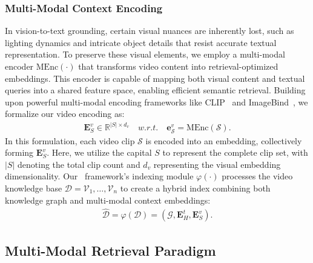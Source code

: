 \subsubsection{Multi-Modal Context Encoding}
\label{sec:visual indexing}

In vision-to-text grounding, certain visual nuances are inherently lost, such as lighting dynamics and intricate object details that resist accurate textual representation. To preserve these visual elements, we employ a multi-modal encoder $\text{MEnc}(\cdot)$ that transforms video content into retrieval-optimized embeddings. This encoder is capable of mapping both visual content and textual queries into a shared feature space, enabling efficient semantic retrieval. Building upon powerful multi-modal encoding frameworks like CLIP~\citep{CLIP} and ImageBind~\citep{Imgebind}, we formalize our video encoding as:
\begin{align}
    \mathbf{E}_{S}^{v} \in \mathbb{R}^{|S| \times d_{v}} \quad \textit{w.r.t.} \quad \textbf{e}_{\mathcal{S}}^{v} = \text{MEnc}(\mathcal{S}).
\end{align}
In this formulation, each video clip $\mathcal{S}$ is encoded into an embedding, collectively forming $\mathbf{E}_{S}^{v}$. Here, we utilize the capital $S$ to represent the complete clip set, with $|S|$ denoting the total clip count and $d_{v}$ representing the visual embedding dimensionality. Our \model\ framework's indexing module $\varphi(\cdot)$ processes the video knowledge base $\mathcal{D} = {\mathcal{V}_1, \ldots, \mathcal{V}_n}$ to create a hybrid index combining both knowledge graph and multi-modal context embeddings:
\begin{align}
    \hat{\mathcal{D}} = \varphi(\mathcal{D}) = (\mathcal{G}, \mathbf{E}_{H}^{t}, \mathbf{E}_{S}^{v}).
\end{align}

\subsection{Multi-Modal Retrieval Paradigm}

